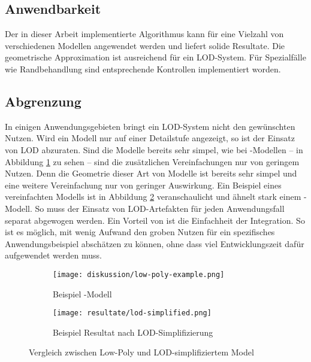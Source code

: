 \subsection{Anwendbarkeit}

Der in dieser Arbeit implementierte Algorithmus kann für eine Vielzahl von verschiedenen Modellen angewendet werden und liefert solide Resultate. Die geometrische Approximation ist ausreichend für ein LOD-System. Für Spezialfälle wie Randbehandlung sind entsprechende Kontrollen implementiert worden.

\subsection{Abgrenzung}

In einigen Anwendungsgebieten bringt ein LOD-System nicht den gewünschten Nutzen. Wird ein Modell nur auf einer Detailstufe angezeigt, so ist der Einsatz von LOD abzuraten. Sind die Modelle bereits sehr simpel, wie bei -Modellen – in Abbildung \ref{fig:lowPolyExample} zu sehen – sind die zusätzlichen Vereinfachungen nur von geringem Nutzen. Denn die Geometrie dieser Art von Modelle ist bereits sehr simpel und eine weitere Vereinfachung nur von geringer Auswirkung. Ein Beispiel eines vereinfachten Modells ist in Abbildung \ref{fig:lodModelSimplified} veranschaulicht und ähnelt stark einem -Modell.
So muss der Einsatz von LOD-Artefakten für jeden Anwendungsfall separat abgewogen werden. Ein Vorteil von  ist die Einfachheit der Integration. So ist es möglich, mit wenig Aufwand den groben Nutzen für ein spezifisches Anwendungsbeispiel abschätzen zu können, ohne dass viel Entwicklungszeit dafür aufgewendet werden muss.

\begin{figure}[H]
  \centering
  \begin{subfigure}{.5\textwidth}
    \centering
    \texttt{[image: diskussion/low-poly-example.png]}
    \caption{Beispiel -Modell}
    \label{fig:lowPolyExample}
  \end{subfigure}%
  \begin{subfigure}{.5\textwidth}
    \centering
    \texttt{[image: resultate/lod-simplified.png]}
    \caption{Beispiel Resultat nach LOD-Simplifizierung}
    \label{fig:lodModelSimplified}
  \end{subfigure}
  \caption{Vergleich zwischen Low-Poly und LOD-simplifiziertem Model}
  \label{fig:comparisonLowPolyAndLOD}
\end{figure}

